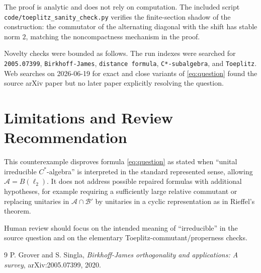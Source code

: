 \documentclass[11pt]{article}
\newcommand{\A}{\mathcal A}
\newcommand{\B}{\mathcal B}
\begin{document}
The proof is analytic and does not rely on computation. The included script
\texttt{code/toeplitz\_sanity\_check.py} verifies the finite-section shadow of
the construction: the commutator of the alternating diagonal with the shift has
stable norm $2$, matching the noncompactness mechanism in the proof.

Novelty checks were bounded as follows. The run indexes were searched for
\texttt{2005.07399}, \texttt{Birkhoff-James}, \texttt{distance formula},
\texttt{C*-subalgebra}, and \texttt{Toeplitz}. Web searches on 2026-06-19 for
exact and close variants of \eqref{eq:question} found the source arXiv paper
but no later paper explicitly resolving the question.

\section{Limitations and Review Recommendation}

This counterexample disproves formula \eqref{eq:question} as stated when
``unital irreducible $C^*$-algebra'' is interpreted in the standard represented
sense, allowing $\A=B(\ell_2)$. It does not address possible repaired formulas
with additional hypotheses, for example requiring a sufficiently large
relative commutant or replacing unitaries in $\A\cap\B'$ by unitaries in a
cyclic representation as in Rieffel's theorem.

Human review should focus on the intended meaning of ``irreducible'' in the
source question and on the elementary Toeplitz-commutant/properness checks.

\begin{thebibliography}{9}
P. Grover and S. Singla,
\emph{Birkhoff-James orthogonality and applications: A survey},
arXiv:2005.07399, 2020.
\end{thebibliography}
\end{document}

